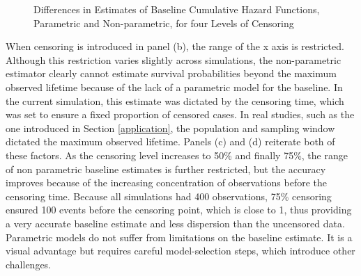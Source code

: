 \begin{figure}[h!]
	\centering
	\quad
	\quad
	\quad
	\caption{Differences in Estimates of Baseline Cumulative Hazard Functions, Parametric and Non-parametric, for four Levels of Censoring}
	\label{fig:rightdiff}
\end{figure}
When censoring is introduced in panel (b), the range of the x axis is restricted.  Although this restriction varies slightly across simulations, the non-parametric estimator clearly cannot estimate survival probabilities beyond the maximum observed lifetime because of the lack of a parametric model for the baseline. In the current simulation, this estimate was dictated by the censoring time, which was set to ensure a fixed proportion of censored cases. In real studies, such as the one introduced in Section \ref{application}, the population and sampling window dictated the maximum observed lifetime. Panels (c) and (d) reiterate both of these factors. As the censoring level increases to 50\% and finally 75\%, the range of non parametric baseline estimates is further restricted, but the accuracy improves because of the increasing concentration of observations before the censoring time. Because all simulations had 400 observations, 75\% censoring ensured 100 events before the censoring point, which is close to 1, thus providing a very accurate baseline estimate and less dispersion than the uncensored data.  Parametric models do not suffer from limitations on the baseline estimate. It is a visual advantage but requires careful model-selection steps, which introduce other challenges.
